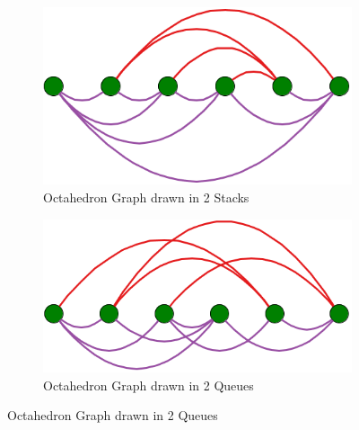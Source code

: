 \documentclass[bachelor, english]{algothesis}
\begin{document}
\begin{figure}[ht]
    \centering
    \begin{subfigure}[b]{0.45\linewidth}
        \includegraphics[width=\linewidth]{figures/octahedron_stack.png}
        \caption{Octahedron Graph drawn in 2 Stacks}
        \label{fig:octahedron_stack}
    \end{subfigure}
    \hfill 
    \begin{subfigure}[b]{0.45\linewidth}
        \includegraphics[width=\linewidth]{figures/octahedron_queue.png}
        \caption{Octahedron Graph drawn in 2 Queues}
        \label{fig:octahedron_queue}
    \end{subfigure}


\end{figure}
\end{document}
